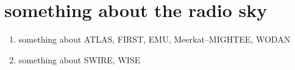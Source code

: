 \chapter{something about the radio sky}

\begin{enumerate}
    \item something about ATLAS, FIRST, EMU, Meerkat--MIGHTEE, WODAN
    \item something about SWIRE, WISE
\end{enumerate}
